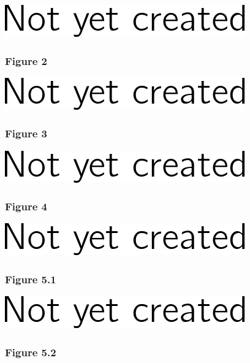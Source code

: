 \documentclass[]{article}
\begin{document}
\includegraphics{figures/feldman2-1.png}

\subsubsection{Figure 2}\label{figure-2-1}

\includegraphics{figures/frankenreiter2-1.png}

\subsubsection{Figure 3}\label{figure-3}

\includegraphics{figures/frankenreiter3-1.png}

\subsubsection{Figure 4}\label{figure-4}

\includegraphics{figures/frankenreiter4-1.png}

\subsubsection{Figure 5.1}\label{figure-5.1}

\includegraphics{figures/frankenreiter5_1-1.png}

\subsubsection{Figure 5.2}\label{figure-5.2}
\end{document}
